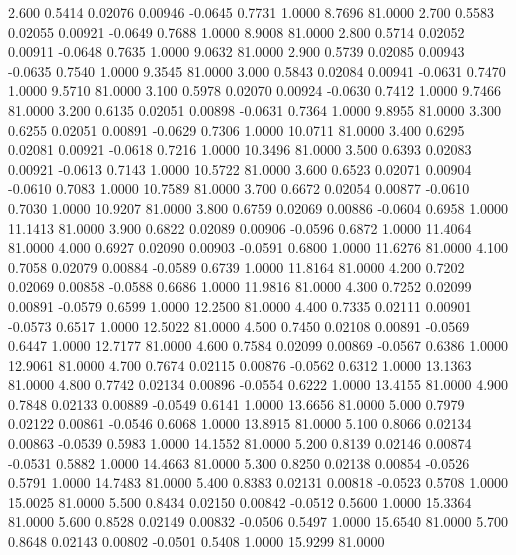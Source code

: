    2.600   0.5414   0.02076   0.00946  -0.0645   0.7731   1.0000   8.7696  81.0000
   2.700   0.5583   0.02055   0.00921  -0.0649   0.7688   1.0000   8.9008  81.0000
   2.800   0.5714   0.02052   0.00911  -0.0648   0.7635   1.0000   9.0632  81.0000
   2.900   0.5739   0.02085   0.00943  -0.0635   0.7540   1.0000   9.3545  81.0000
   3.000   0.5843   0.02084   0.00941  -0.0631   0.7470   1.0000   9.5710  81.0000
   3.100   0.5978   0.02070   0.00924  -0.0630   0.7412   1.0000   9.7466  81.0000
   3.200   0.6135   0.02051   0.00898  -0.0631   0.7364   1.0000   9.8955  81.0000
   3.300   0.6255   0.02051   0.00891  -0.0629   0.7306   1.0000  10.0711  81.0000
   3.400   0.6295   0.02081   0.00921  -0.0618   0.7216   1.0000  10.3496  81.0000
   3.500   0.6393   0.02083   0.00921  -0.0613   0.7143   1.0000  10.5722  81.0000
   3.600   0.6523   0.02071   0.00904  -0.0610   0.7083   1.0000  10.7589  81.0000
   3.700   0.6672   0.02054   0.00877  -0.0610   0.7030   1.0000  10.9207  81.0000
   3.800   0.6759   0.02069   0.00886  -0.0604   0.6958   1.0000  11.1413  81.0000
   3.900   0.6822   0.02089   0.00906  -0.0596   0.6872   1.0000  11.4064  81.0000
   4.000   0.6927   0.02090   0.00903  -0.0591   0.6800   1.0000  11.6276  81.0000
   4.100   0.7058   0.02079   0.00884  -0.0589   0.6739   1.0000  11.8164  81.0000
   4.200   0.7202   0.02069   0.00858  -0.0588   0.6686   1.0000  11.9816  81.0000
   4.300   0.7252   0.02099   0.00891  -0.0579   0.6599   1.0000  12.2500  81.0000
   4.400   0.7335   0.02111   0.00901  -0.0573   0.6517   1.0000  12.5022  81.0000
   4.500   0.7450   0.02108   0.00891  -0.0569   0.6447   1.0000  12.7177  81.0000
   4.600   0.7584   0.02099   0.00869  -0.0567   0.6386   1.0000  12.9061  81.0000
   4.700   0.7674   0.02115   0.00876  -0.0562   0.6312   1.0000  13.1363  81.0000
   4.800   0.7742   0.02134   0.00896  -0.0554   0.6222   1.0000  13.4155  81.0000
   4.900   0.7848   0.02133   0.00889  -0.0549   0.6141   1.0000  13.6656  81.0000
   5.000   0.7979   0.02122   0.00861  -0.0546   0.6068   1.0000  13.8915  81.0000
   5.100   0.8066   0.02134   0.00863  -0.0539   0.5983   1.0000  14.1552  81.0000
   5.200   0.8139   0.02146   0.00874  -0.0531   0.5882   1.0000  14.4663  81.0000
   5.300   0.8250   0.02138   0.00854  -0.0526   0.5791   1.0000  14.7483  81.0000
   5.400   0.8383   0.02131   0.00818  -0.0523   0.5708   1.0000  15.0025  81.0000
   5.500   0.8434   0.02150   0.00842  -0.0512   0.5600   1.0000  15.3364  81.0000
   5.600   0.8528   0.02149   0.00832  -0.0506   0.5497   1.0000  15.6540  81.0000
   5.700   0.8648   0.02143   0.00802  -0.0501   0.5408   1.0000  15.9299  81.0000
